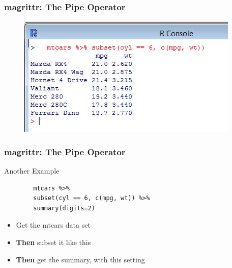 \documentclass{beamer}
\begin{document}
\begin{frame}
\frametitle{magrittr: The Pipe Operator}
\large
\begin{figure}
\centering
\includegraphics[width=0.99\linewidth]{images/magrittrcode01}
\end{figure}
\end{frame}
%		
%		
%	
\begin{frame}[fragile]
\frametitle{magrittr: The Pipe Operator}
\large
Another Example
	\begin{framed}
		\begin{verbatim}	
		mtcars %>% 
		subset(cyl == 6, c(mpg, wt)) %>% 
		summary(digits=2)
		\end{verbatim}
	\end{framed}
	\begin{itemize}
		\item Get the mtcars data set
		\item \textbf{Then} subset it like this
		\item \textbf{Then} get the summary, with this setting
	\end{itemize}
\end{frame}
\end{document}
